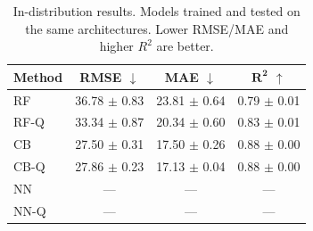 \begin{table}[t]
    \centering
    \caption{In-distribution results. Models trained and tested on the same architectures. Lower RMSE/MAE and higher $R^2$ are better.}
    \label{tab:id-results}
    \begin{tabular}{lccc}
        \toprule
        \textbf{Method} & \textbf{RMSE} $\downarrow$ & \textbf{MAE} $\downarrow$ & $\boldsymbol{R^2}$ $\uparrow$ \\
        \midrule
        RF      & 36.78 $\pm$ 0.83 & 23.81 $\pm$ 0.64 & 0.79 $\pm$ 0.01 \\
        RF-Q    & 33.34 $\pm$ 0.87 & 20.34 $\pm$ 0.60 & 0.83 $\pm$ 0.01 \\
        \midrule
        CB      & 27.50 $\pm$ 0.31 & 17.50 $\pm$ 0.26 & 0.88 $\pm$ 0.00 \\
        CB-Q    & 27.86 $\pm$ 0.23 & 17.13 $\pm$ 0.04 & 0.88 $\pm$ 0.00 \\
        \midrule
        NN      & --- & --- & --- \\
        NN-Q    & --- & --- & --- \\
        \bottomrule
    \end{tabular}
\end{table}